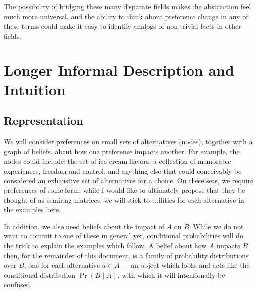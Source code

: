 \documentclass{article}
\begin{document}
	The possibility of bridging these many disparate fields makes the abstraction feel much more universal, and the ability to think about preference change in any of these terms could make it easy to identify analogs of non-trivial facts in other fields.
	
	

	
	
	

	\section{Longer Informal Description and Intuition}
	
	\subsection{Representation}
	We will consider preferences on small sets of alternatives (nodes), together with a graph of beliefs, about how one preference impacts another. For example, the nodes could include: the set of ice cream flavors, a collection of memorable experiences, freedom and control, and anything else that could conceivably be considered an exhaustive set of alternatives for a choice. On these sets, we require preferences of some form; while I would like to ultimately propose that they be thought of as semiring matrices, we will stick to utilities for each alternative in the examples here.
	
	In addition, we also need beliefs about the impact of $A$ on $B$. While we do not want to commit to one of these in general yet, conditional probabilities will do the trick to explain the examples which follow. A belief about how $A$ impacts $B$ then, for the remainder of this document, is a family of probability distributions over $B$, one for each alternative $a \in A$ --- an object which looks and acts like the conditional distribution $\Pr(B \mid A)$, with which it will intentionally be confused.
	
\end{document}
